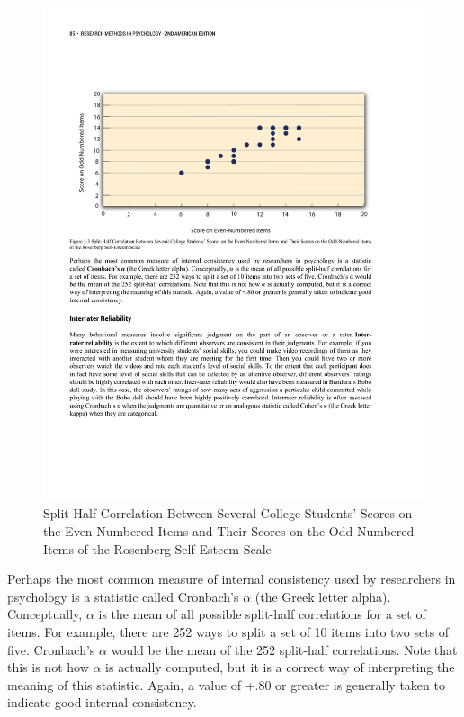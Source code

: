 \begin{figure}
      \includegraphics[width=\linewidth]{figures/C5internal.pdf}
      \caption{Split-Half Correlation Between Several College Students' Scores on the Even-Numbered Items and Their Scores on the Odd-Numbered Items of the Rosenberg Self-Esteem Scale}
      \label{fig:testretest}

\end{figure}

Perhaps the most common measure of internal consistency used by researchers in psychology is a statistic called Cronbach's $\alpha$ (the Greek letter alpha). Conceptually, $\alpha$ is the mean of all possible split-half correlations for a set of items. For example, there are 252 ways to split a set of 10 items into two sets of five. Cronbach's $\alpha$ would be the mean of the 252 split-half correlations. Note that this is not how $\alpha$ is actually computed, but it is a correct way of interpreting the meaning of this statistic. Again, a value of +.80 or greater is generally taken to indicate good internal consistency.

